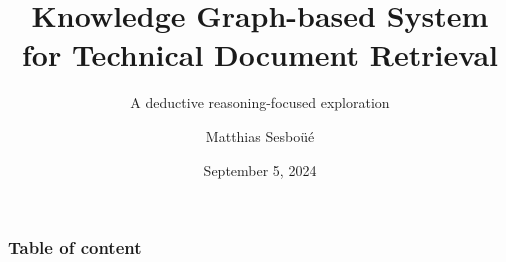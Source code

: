

\title{Knowledge Graph-based System for Technical Document Retrieval}
\subtitle{A deductive reasoning-focused exploration}
\author{Matthias Sesboüé}
\date{September 5, 2024}


    \frame{\titlepage}
    
    \section[Table of content]{}
    \frame
    {
    \frametitle{Table of content}
    \tableofcontents
    }
    
    

    
    
    

    
    
